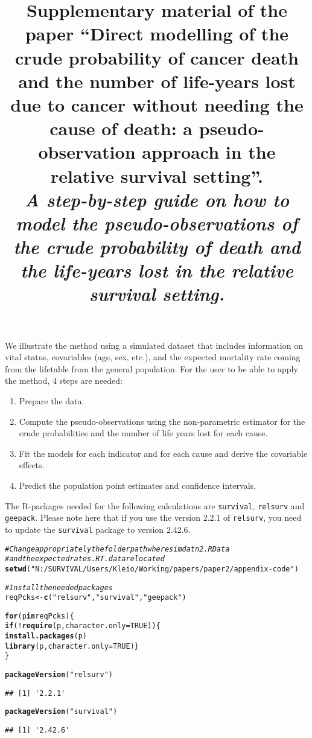 \documentclass[a4paper,11pt]{article}\usepackage[]{graphicx}\usepackage[]{color}
\title{Supplementary material of the paper ``Direct modelling of the crude probability of cancer death and the
number of life-years lost due to cancer without needing the cause of death: a pseudo-observation approach in the relative survival setting''. \\ \textit{A step-by-step guide on how to model the pseudo-observations of the crude probability of death and the life-years lost in the relative survival setting.}}
\makeatletter
\newcommand{\hlnum}[1]{\textcolor[rgb]{0.686,0.059,0.569}{#1}}%
\newcommand{\hlstr}[1]{\textcolor[rgb]{0.192,0.494,0.8}{#1}}%
\newcommand{\hlcom}[1]{\textcolor[rgb]{0.678,0.584,0.686}{\textit{#1}}}%
\newcommand{\hlopt}[1]{\textcolor[rgb]{0,0,0}{#1}}%
\newcommand{\hlstd}[1]{\textcolor[rgb]{0.345,0.345,0.345}{#1}}%
\newcommand{\hlkwa}[1]{\textcolor[rgb]{0.161,0.373,0.58}{\textbf{#1}}}%
\newcommand{\hlkwb}[1]{\textcolor[rgb]{0.69,0.353,0.396}{#1}}%
\newcommand{\hlkwc}[1]{\textcolor[rgb]{0.333,0.667,0.333}{#1}}%
\newcommand{\hlkwd}[1]{\textcolor[rgb]{0.737,0.353,0.396}{\textbf{#1}}}%
\newenvironment{kframe}{%
 \def\at@end@of@kframe{}%
 \ifinner\ifhmode%
  \def\at@end@of@kframe{\end{minipage}}%
  \begin{minipage}{\columnwidth}%
 \fi\fi%
 \def\FrameCommand##1{\hskip\@totalleftmargin \hskip-\fboxsep
 \colorbox{shadecolor}{##1}\hskip-\fboxsep
     \hskip-\linewidth \hskip-\@totalleftmargin \hskip\columnwidth}%
 \MakeFramed {\advance\hsize-\width
   \@totalleftmargin\z@ \linewidth\hsize
   \@setminipage}}%
 {\par\unskip\endMakeFramed%
 \at@end@of@kframe}
\newenvironment{knitrout}{}{} %
\makeatother
\begin{document}
\maketitle

We illustrate the method using a simulated dataset that includes information on vital status, covariables (age, sex, etc.), and the expected mortality rate coming from the lifetable from the general population. For the user to be able to apply the method, 4 steps are needed:

\begin{enumerate}
  \item Prepare the data. 
  \item Compute the pseudo-observations using the non-parametric estimator for the crude probabilities and the number of life years lost for each cause.
  \item Fit the models for each indicator and for each cause and derive the covariable effects.
  \item Predict the population point estimates and confidence intervals. 
\end{enumerate}

The R-packages needed for the following calculations are \texttt{survival}, \texttt{relsurv} and \texttt{geepack}. Please note here that if you use the version 2.2.1 of \texttt{relsurv}, you need to update the \texttt{survival} package to version 2.42.6. 



\begin{knitrout}
\color{fgcolor}\begin{kframe}
\begin{alltt}
\hlcom{# Change appropriately the folder path where simdatn2.RData }
\hlcom{# and the expectedrates.RT.dat are located}
\hlkwd{setwd}\hlstd{(}\hlstr{"N:/SURVIVAL/Users/Kleio/Working/papers/paper 2/appendix-code"}\hlstd{)}

\hlcom{# Install the needed packages}
\hlstd{reqPcks} \hlkwb{<-} \hlkwd{c}\hlstd{(}\hlstr{"relsurv"}\hlstd{,} \hlstr{"survival"}\hlstd{,}\hlstr{"geepack"}\hlstd{)}

\hlkwa{for}\hlstd{(p} \hlkwa{in} \hlstd{reqPcks)\{}
  \hlkwa{if}\hlstd{(}\hlopt{!}\hlkwd{require}\hlstd{(p,} \hlkwc{character.only}\hlstd{=}\hlnum{TRUE}\hlstd{)) \{}
    \hlkwd{install.packages}\hlstd{(p)}
    \hlkwd{library}\hlstd{(p,} \hlkwc{character.only} \hlstd{=} \hlnum{TRUE}\hlstd{)\}}
\hlstd{\}}

\hlkwd{packageVersion}\hlstd{(}\hlstr{"relsurv"}\hlstd{)}
\end{alltt}
\begin{verbatim}
## [1] '2.2.1'
\end{verbatim}
\begin{alltt}
\hlkwd{packageVersion}\hlstd{(}\hlstr{"survival"}\hlstd{)}
\end{alltt}
\begin{verbatim}
## [1] '2.42.6'
\end{verbatim}
\end{kframe}
\end{knitrout}
\end{document}
